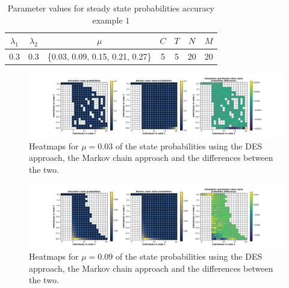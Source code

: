 \begin{table}[H]
    \centering
    \caption{Parameter values for steady state probabilities accuracy example
    \(1\)}
    \begin{tabular}{||c|c|c|c|c|c|c||}
        \hline
        \(\lambda_1\) & \(\lambda_2\) & \(\mu\) & \(C\) & \(T\) & \(N\) & \(M\) \\
        \hline
        0.3 & 0.3 & \{0.03, 0.09, 0.15, 0.21, 0.27\} & 5 & 5 & 20 & 20 \\
        \hline
    \end{tabular}
    \label{tab:parameters_steady_state_probabilities_accuracy}
\end{table}


\begin{figure}[H]
    \includegraphics[width=\textwidth, trim=100 10 100 10, clip]{chapters/03_queueing_model/Bin/numeric_results_and_timings/steady_state_probabilities/main_1.pdf}
    \caption{Heatmaps for \(\mu = 0.03\) of the state probabilities using the
    DES approach, the Markov chain approach and the differences between the
    two.}
    \label{fig:comparison_steady_state_probabilities_1}
\end{figure}

\begin{figure}[H]
    \includegraphics[width=\textwidth, trim=100 10 100 10, clip]{chapters/03_queueing_model/Bin/numeric_results_and_timings/steady_state_probabilities/main_3.pdf}
    \caption{Heatmaps for \(\mu = 0.09\) of the state probabilities using the
    DES approach, the Markov chain approach and the differences between the
    two.}
    \label{fig:comparison_steady_state_probabilities_2}
\end{figure}

